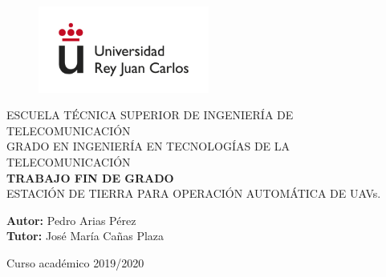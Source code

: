 \begin{figure}[t]
    \centering\includegraphics[width=0.5\textwidth]{figures/urjc_logo_letters.jpg}
\end{figure}

\begin{center}
    \textsc{ \Large{ESCUELA TÉCNICA SUPERIOR DE INGENIERÍA DE TELECOMUNICACIÓN \\}}
    \vspace{10mm}
	\textnormal{ \Large{GRADO EN INGENIERÍA  EN TECNOLOGÍAS DE LA TELECOMUNICACIÓN\\}}
	\vspace{25mm}
    \textup{\LARGE{\textbf{TRABAJO FIN DE GRADO}}} \\
    
    \vspace{25mm}
    \textnormal{ \Large{ESTACIÓN DE TIERRA PARA OPERACIÓN AUTOMÁTICA DE UAVs.}}
\end{center}

\vspace{30mm}

\begin{center}
    \textnormal{\normalsize{\textbf{Autor:} Pedro Arias Pérez \\}}
    \textnormal{\normalsize{\textbf{Tutor:} José María Cañas Plaza \\}}

\end{center}

\vspace{20mm}

\begin{center}
   \normalsize{Curso académico 2019/2020} 
\end{center}
